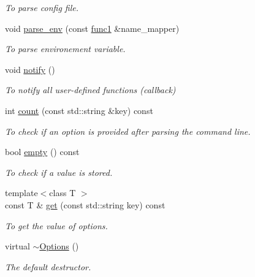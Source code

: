 \begin{DoxyCompactItemize}
\begin{DoxyCompactList}\small\item\em To parse config file. \item\end{DoxyCompactList}\item 
void \hyperlink{classOptions_a2b7bc0da71a508d8b03703a045e3ee8c}{parse\_\-env} (const \hyperlink{Options_8hpp_a3e992ba9ff50fb8a17ae2d36ea9b3f80}{func1} \&name\_\-mapper)
\begin{DoxyCompactList}\small\item\em To parse environement variable. \item\end{DoxyCompactList}\item 
\hypertarget{classOptions_ac3c10bdaf1149f4a6ff45245a67d9948}{
void \hyperlink{classOptions_ac3c10bdaf1149f4a6ff45245a67d9948}{notify} ()}
\label{classOptions_ac3c10bdaf1149f4a6ff45245a67d9948}

\begin{DoxyCompactList}\small\item\em To notify all user-\/defined functions (callback) \item\end{DoxyCompactList}\item 
int \hyperlink{classOptions_ac4172898028eda1e46fc53043729906f}{count} (const std::string \&key) const 
\begin{DoxyCompactList}\small\item\em To check if an option is provided after parsing the command line. \item\end{DoxyCompactList}\item 
\hypertarget{classOptions_a8a7550b7c30cfc130d3545329512dc94}{
bool \hyperlink{classOptions_a8a7550b7c30cfc130d3545329512dc94}{empty} () const }
\label{classOptions_a8a7550b7c30cfc130d3545329512dc94}

\begin{DoxyCompactList}\small\item\em To check if a value is stored. \item\end{DoxyCompactList}\item 
{\footnotesize template$<$class T $>$ }\\const T \& \hyperlink{classOptions_ac38ac6753b19140073a33d2b3da5229c}{get} (const std::string key) const 
\begin{DoxyCompactList}\small\item\em To get the value of options. \item\end{DoxyCompactList}\item 
\hypertarget{classOptions_afa785625cf3c12ee5171e59158c554b0}{
virtual \hyperlink{classOptions_afa785625cf3c12ee5171e59158c554b0}{$\sim$Options} ()}
\label{classOptions_afa785625cf3c12ee5171e59158c554b0}

\begin{DoxyCompactList}\small\item\em The default destructor. \item\end{DoxyCompactList}\end{DoxyCompactItemize}
